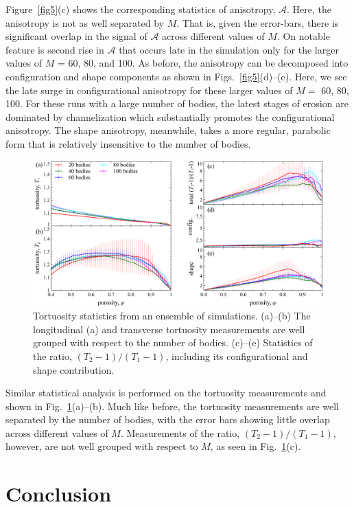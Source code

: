 \documentclass[3p]{elsarticle}
\newcommand{\anis}{\mathcal{A}}
\begin{document}
Figure~\ref{fig5}(c) shows the corresponding statistics of anisotropy, $\anis$. Here, the anisotropy is not as well separated by $M$. That is, given the error-bars, there is significant overlap in the signal of $\anis$ across different values of $M$. On notable feature is second rise in $\anis$ that occurs late in the simulation only for the larger values of $M$ = 60, 80, and 100. As before, the anisotropy can be decomposed into configuration and shape components as shown in Figs.~\ref{fig5}(d)--(e). Here, we see the late surge in configurational anisotropy for these larger values of $M = $ 60, 80, 100. For these runs with a large number of bodies, the latest stages of erosion are dominated by channelization which substantially promotes the configurational anisotropy. The shape anisotropy, meanwhile, takes a more regular, parabolic form that is relatively insensitive to the number of bodies.

\begin{figure}%
\centering
\includegraphics[width = 0.9 \textwidth]{./figs/fig6.pdf}
\caption{
Tortuosity statistics from an ensemble of simulations.
(a)--(b) The longitudinal (a) and transverse tortuosity measurements are well grouped with respect to the number of bodies. (c)--(e) Statistics of the ratio, $(T_2 -1)/(T_1 -1)$, including its configurational and shape contribution.
\label{fig6}
}
\end{figure}

Similar statistical analysis is performed on the tortuosity measurements and shown in Fig.~\ref{fig6}(a)--(b). Much like before, the tortuosity measurements are well separated by the number of bodies, with the error bars showing little overlap across different values of $M$. Measurements of the ratio, $(T_2 -1)/(T_1 -1)$, however, are not well grouped with respect to $M$, as seen in Fig.~\ref{fig6}(c). 

\section{Conclusion}
\label{sec:conclusion}




\end{document}
